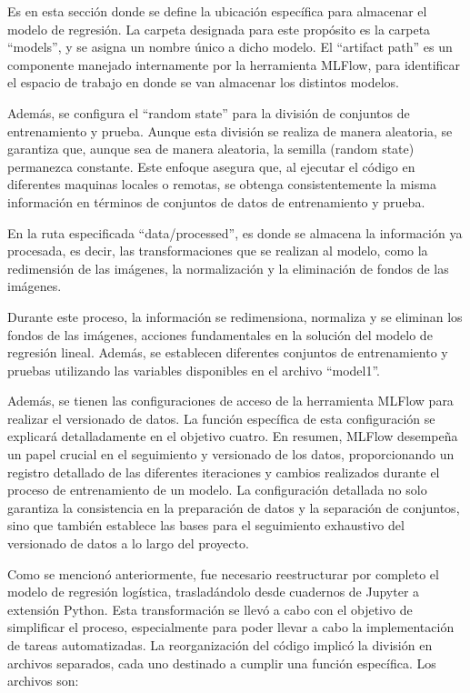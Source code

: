 \newpage

Es en esta sección donde se define la ubicación específica para almacenar el modelo de regresión. La carpeta designada para este propósito es la carpeta ``models'', y se asigna un nombre único a dicho modelo. El ``artifact path'' es un componente manejado internamente por la herramienta MLFlow, para identificar el espacio de trabajo en donde se van almacenar los distintos modelos. \newline

Además, se configura el ``random state'' para la división de conjuntos de entrenamiento y prueba. Aunque esta división se realiza de manera aleatoria, se garantiza que, aunque sea de manera aleatoria, la semilla (random state) permanezca constante. Este enfoque asegura que, al ejecutar el código en diferentes maquinas locales o remotas, se obtenga consistentemente la misma información en términos de conjuntos de datos de entrenamiento y prueba. \newline

En la ruta especificada ``data/processed'', es donde se almacena la información ya procesada, es decir, las transformaciones que se realizan al modelo, como la redimensión de las imágenes, la normalización y la eliminación de fondos de las imágenes. \newline

Durante este proceso, la información se redimensiona, normaliza y se eliminan los fondos de las imágenes, acciones fundamentales en la solución del modelo de regresión lineal. Además, se establecen diferentes conjuntos de entrenamiento y pruebas utilizando las variables disponibles en el archivo ``model1''. \newline

Además, se tienen las configuraciones de acceso de la herramienta MLFlow para realizar el versionado de datos. La función específica de esta configuración se explicará detalladamente en el objetivo cuatro. En resumen, MLFlow desempeña un papel crucial en el seguimiento y versionado de los datos, proporcionando un registro detallado de las diferentes iteraciones y cambios realizados durante el proceso de entrenamiento de un modelo. La configuración detallada no solo garantiza la consistencia en la preparación de datos y la separación de conjuntos, sino que también establece las bases para el seguimiento exhaustivo del versionado de datos a lo largo del proyecto.

\newpage

Como se mencionó anteriormente, fue necesario reestructurar por completo el modelo de regresión logística, trasladándolo desde cuadernos de Jupyter a extensión Python. Esta transformación se llevó a cabo con el objetivo de simplificar el proceso, especialmente para poder llevar a cabo la implementación de tareas automatizadas. La reorganización del código implicó la división en archivos separados, cada uno destinado a cumplir una función específica. Los archivos son: \newline

